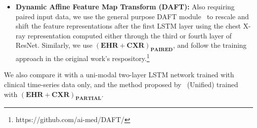 \documentclass[pmlr]{jmlr}
\begin{document}
\begin{itemize}
\item \textbf{Dynamic Affine Feature Map Transform (DAFT):} Also requiring paired input data, we use the general purpose DAFT module~\citep{daft} to rescale and shift the feature representations after the first LSTM layer using the chest X-ray representation computed either through the third or fourth layer of ResNet. Similarly, we use $(\mathbf{EHR}+\mathbf{CXR})_\mathbf{PAIRED}$, and follow the training approach in the original work's respository.\footnote{https://github.com/ai-med/DAFT/} \end{itemize} 

\noindent We also compare it with a uni-modal two-layer LSTM network trained with clinical time-series data only, and the method proposed by~\cite{hayat2021dynamic} (Unified) trained with $(\mathbf{EHR}+\mathbf{CXR})_\mathbf{PARTIAL}$. 
\end{document}
